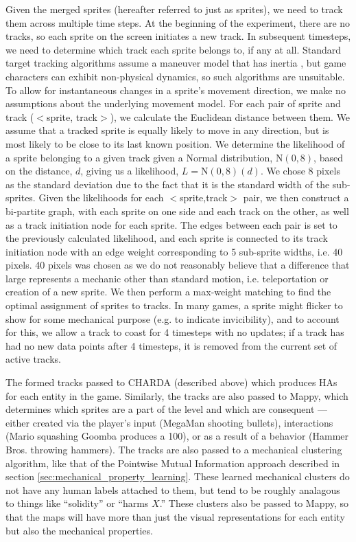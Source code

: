 \documentclass[a4paper]{article}
\begin{document}
Given the merged sprites (hereafter referred to just as sprites), we need to track them across multiple time steps.  At the beginning of the experiment, there are no tracks, so each sprite on the screen initiates a new track.  In subsequent timesteps, we need to determine which track each sprite belongs to, if any at all.  Standard target tracking algorithms assume a maneuver model that has inertia \cite{kalman,imm}, but game characters can exhibit non-physical dynamics, so such algorithms are unsuitable.  To allow for instantaneous changes in a sprite's movement direction, we make no assumptions about the underlying movement model.  For each pair of sprite and track ($<$sprite, track$>$), we calculate the Euclidean distance between them.  We assume that a tracked sprite is equally likely to move in any direction, but is most likely to be close to its last known position.  We determine the likelihood of a sprite belonging to a given track given a Normal distribution, $\mathrm{N}(0,8)$, based on the distance, $d$, giving us a likelihood, $L = \mathrm{N}(0,8)(d)$.  We chose 8 pixels as the standard deviation due to the fact that it is the standard width of the sub-sprites.  Given the likelihoods for each $<$sprite,track$>$ pair, we then construct a bi-partite graph, with each sprite on one side and each track on the other, as well as a track initiation node for each sprite.  The edges between each pair is set to the previously calculated likelihood, and each sprite is connected to its track initiation node with an edge weight corresponding to 5 sub-sprite widths, i.e. 40 pixels.  40 pixels was chosen as we do not reasonably believe that a difference that large represents a mechanic other than standard motion, i.e. teleportation or creation of a new sprite.  We then perform a max-weight matching to find the optimal assignment of sprites to tracks.  In many games, a sprite might flicker to show for some mechanical purpose (e.g. to indicate invicibility), and to account for this, we allow a track to coast for 4 timesteps with no updates; if a track has had no new data points after 4 timesteps, it is removed from the current set of active tracks.

The formed tracks passed to CHARDA (described above) which produces HAs for each entity in the game.  Similarly, the tracks are also passed to Mappy, which determines which sprites are a part of the level and which are consequent --- either created via the player's input (MegaMan shooting bullets), interactions (Mario squashing Goomba produces a 100), or as a result of a behavior (Hammer Bros. throwing hammers).  The tracks are also passed to a mechanical clustering algorithm, like that of the Pointwise Mutual Information approach described in section \ref{sec:mechanical_property_learning}. These learned mechanical clusters do not have any human labels attached to them, but tend to be roughly analagous to things like ``solidity'' or ``harms $X$.''  These clusters also be passed to Mappy, so that the maps will have more than just the visual representations for each entity but also the mechanical properties.  
\end{document}
